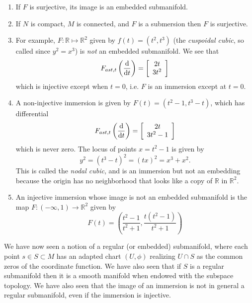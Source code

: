 \begin{enumerate}
  \item{
    If $F$ is surjective, its image is an embedded submanifold.
  }
  \item{
    If $N$ is compact, $M$ is connected, and $F$ is a submersion then
    $F$ is surjective.
  }
  \item{
    For example, $F: \mathbb{R} \mapsto \mathbb{R}^2$ given by
    $f(t) = (t^2, t^3)$ (the \emph{cuspoidal cubic}, so called since
    $y^2 = x^3$) is \emph{not} an embedded submanifold. We see that
    $$
      F_{ast, t}
        \left(
          \frac{\mathop{}\!\mathrm{d}}{\mathop{}\!\mathrm{d} t}
        \right)
    = \left[
        \begin{array}{c}
          2t \\ 3t^2
        \end{array}
      \right]
    $$
    which is injective except when $t = 0$, i.e. $F$ is an immersion
    except at $t = 0$.
  }
  \item{
    A non-injective immersion is given by
    $F(t) = (t^2 - 1, t^3 - t)$, which has differential
    $$
      F_{ast, t}
        \left(
          \frac{\mathop{}\!\mathrm{d}}{\mathop{}\!\mathrm{d} t}
        \right)
    = \left[
        \begin{array}{c}
          2t \\ 3t^2 - 1
        \end{array}
      \right]
    $$
    which is never zero. The locus of points
    $x = t^2 - 1$ is given by
    $$
      y^2
    = (t^3 - t)^2
    = (tx)^2
    = x^3 + x^2.
    $$
    This is called the \emph{nodal cubic}, and is an immersion but not
    an embedding because the origin has no neighborhood that looks
    like a copy of $\mathbb{R}$ in $\mathbb{R}^2$.
  }
  \item{
    An injective immersion whose image is not an embedded submanifold
    is the map $F: (-\infty, 1) \to \mathbb{R}^2$ given by
    $$
      F(t)
    = \left(
        \frac{t^2 - 1}{t^2 + 1},
        \frac{t(t^2 - 1)}{t^2 + 1}
      \right)
    $$
  }
\end{enumerate}

We have now seen a notion of a regular (or embedded) submanifold,
where each point $s \in S \subset M$ has an adapted chart $(U, \phi)$
realizing $U \cap S$ as the common zeros of the coordinate
function. We have also seen that if $S$ is a regular submanifold then
it is a smooth manifold when endowed with the subspace topology. We
have also seen that the image of an immersion is not in general a
regular submanifold, even if the immersion is injective.

